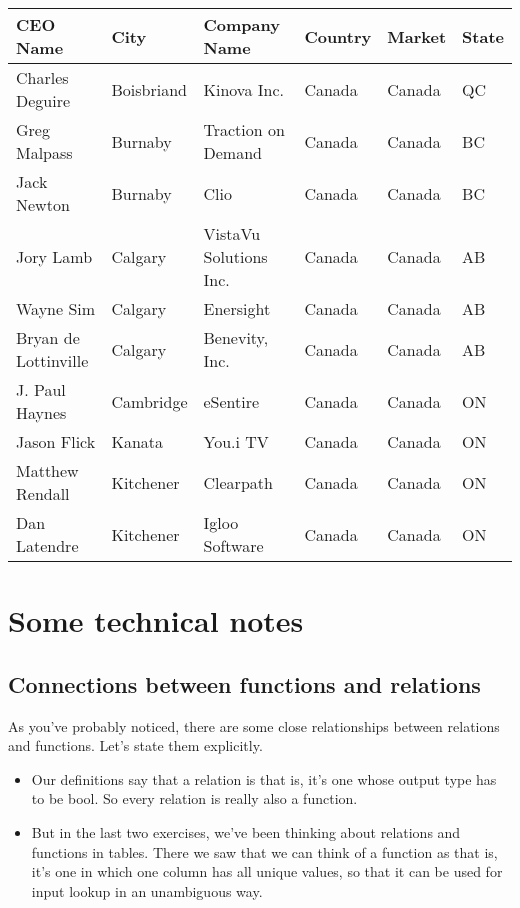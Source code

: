 \documentclass[letterpaper,10pt,english]{sphinxmanual}
\begin{document}
\begin{savenotes}\sphinxattablestart
\centering
\begin{tabulary}{\linewidth}[t]{|T|T|T|T|T|T|}
\hline
\sphinxstyletheadfamily 
CEO Name
&\sphinxstyletheadfamily 
City
&\sphinxstyletheadfamily 
Company Name
&\sphinxstyletheadfamily 
Country
&\sphinxstyletheadfamily 
Market
&\sphinxstyletheadfamily 
State
\\
\hline
Charles Deguire
&
Boisbriand
&
Kinova Inc.
&
Canada
&
Canada
&
QC
\\
\hline
Greg Malpass
&
Burnaby
&
Traction on Demand
&
Canada
&
Canada
&
BC
\\
\hline
Jack Newton
&
Burnaby
&
Clio
&
Canada
&
Canada
&
BC
\\
\hline
Jory Lamb
&
Calgary
&
VistaVu Solutions Inc.
&
Canada
&
Canada
&
AB
\\
\hline
Wayne Sim
&
Calgary
&
Enersight
&
Canada
&
Canada
&
AB
\\
\hline
Bryan de Lottinville
&
Calgary
&
Benevity, Inc.
&
Canada
&
Canada
&
AB
\\
\hline
J. Paul Haynes
&
Cambridge
&
eSentire
&
Canada
&
Canada
&
ON
\\
\hline
Jason Flick
&
Kanata
&
You.i TV
&
Canada
&
Canada
&
ON
\\
\hline
Matthew Rendall
&
Kitchener
&
Clearpath
&
Canada
&
Canada
&
ON
\\
\hline
Dan Latendre
&
Kitchener
&
Igloo Software
&
Canada
&
Canada
&
ON
\\
\hline
\end{tabulary}
\par
\sphinxattableend\end{savenotes}


\section{Some technical notes}
\label{\detokenize{chapter-2-mathematical-foundations:some-technical-notes}}

\subsection{Connections between functions and relations}
\label{\detokenize{chapter-2-mathematical-foundations:connections-between-functions-and-relations}}
As you’ve probably noticed, there are some close relationships between relations and functions.  Let’s state them explicitly.
\begin{itemize}
\item {} 
Our definitions say that a relation is  that is, it’s one whose output type has to be bool.  So every relation is really also a function.

\item {} 
But in the last two exercises, we’ve been thinking about relations and functions in tables.  There we saw that we can think of a function as  that is, it’s one in which one column has all unique values, so that it can be used for input lookup in an unambiguous way.

\end{itemize}
\end{document}
